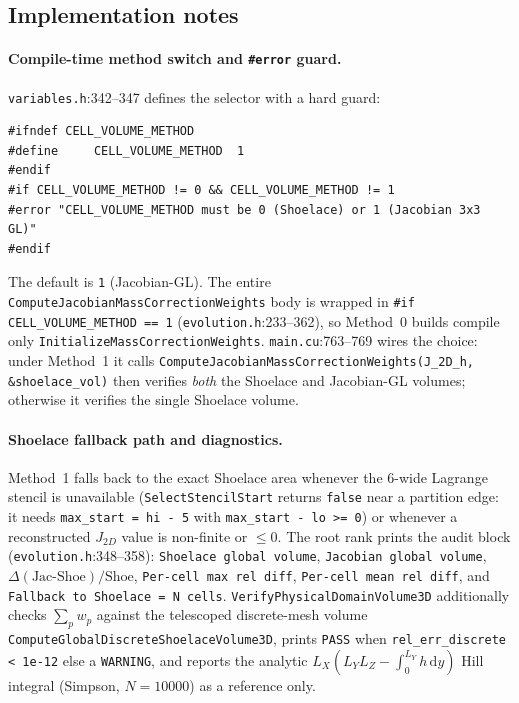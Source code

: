 \documentclass[11pt]{article}
\theoremstyle{definition}
\theoremstyle{remark}
\providecommand{\path}[1]{\texttt{#1}}
\begin{document}
\subsection{Implementation notes}
\label{sec:impl:notes}

\paragraph{Compile-time method switch and \texttt{\#error} guard.}
\path{variables.h}:342--347 defines the selector with a hard guard:
\begin{lstlisting}[caption={Method selector with compile-time guard (\texttt{variables.h}:342--347).}]
#ifndef CELL_VOLUME_METHOD
#define     CELL_VOLUME_METHOD  1
#endif
#if CELL_VOLUME_METHOD != 0 && CELL_VOLUME_METHOD != 1
#error "CELL_VOLUME_METHOD must be 0 (Shoelace) or 1 (Jacobian 3x3 GL)"
#endif
\end{lstlisting}
The default is \texttt{1} (Jacobian-GL). The entire
\texttt{ComputeJacobianMassCorrectionWeights} body is wrapped in
\texttt{\#if CELL\_VOLUME\_METHOD == 1} (\path{evolution.h}:233--362), so Method~0
builds compile only \texttt{InitializeMassCorrectionWeights}. \path{main.cu}:763--769
wires the choice: under Method~1 it calls
\texttt{ComputeJacobianMassCorrectionWeights(J\_2D\_h, \&shoelace\_vol)} then verifies
\emph{both} the Shoelace and Jacobian-GL volumes; otherwise it verifies the single
Shoelace volume.

\paragraph{Shoelace fallback path and diagnostics.}
Method~1 falls back to the exact Shoelace area whenever the 6-wide Lagrange stencil
is unavailable (\texttt{SelectStencilStart} returns \texttt{false} near a partition
edge: it needs \texttt{max\_start = hi - 5} with \texttt{max\_start - lo >= 0}) or
whenever a reconstructed $J_{2D}$ value is non-finite or $\le 0$. The root rank
prints the audit block (\path{evolution.h}:348--358): \texttt{Shoelace global
volume}, \texttt{Jacobian global volume}, $\Delta(\text{Jac-Shoe})/\text{Shoe}$,
\texttt{Per-cell max rel diff}, \texttt{Per-cell mean rel diff}, and
\texttt{Fallback to Shoelace = N cells}. \texttt{VerifyPhysicalDomainVolume3D}
additionally checks $\sum_p w_p$ against the telescoped discrete-mesh volume
\texttt{ComputeGlobalDiscreteShoelaceVolume3D}, prints \texttt{PASS} when
\texttt{rel\_err\_discrete < 1e-12} else a \texttt{WARNING}, and reports the
analytic $L_X(L_Y L_Z-\!\int_0^{L_Y}\!h\,\mathrm dy)$ Hill integral (Simpson,
$N=10000$) as a reference only.
\end{document}
